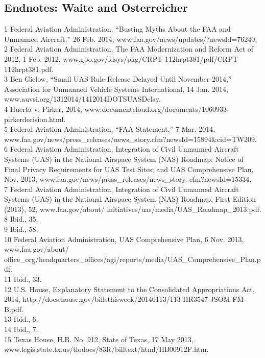 \begin{itemize}
\begin{itemized}
\begin{itemize}
\section{Endnotes: Waite and Osterreicher}
1 Federal Aviation Administration, ``Busting Myths About the FAA and Unmanned Aircraft,'' 26 Feb.
2014, www.faa.gov/news/updates/?newsId=76240.\\
2 Federal Aviation Administration, The FAA Modernization and Reform Act of 2012, 1 Feb. 2012,
www.gpo.gov/fdsys/pkg/CRPT-112hrpt381/pdf/CRPT-112hrpt381.pdf.\\
3 Ben Gielow, ``Small UAS Rule Release Delayed Until November 2014,'' Association for Unmanned
Vehicle Systems International, 14 Jan. 2014, www.auvsi.org/1312014/1412014DOTSUASDelay.\\
4 Huerta v. Pirker, 2014, www.documentcloud.org/documents/1060933-pirkerdecision.html.\\
5 Federal Aviation Administration, ``FAA Statement,'' 7 Mar. 2014, www.faa.gov/news/press_releases/news_story.cfm?newsId=15894&cid=TW209.\\
6 Federal Aviation Administration, Integration of Civil Unmanned Aircraft Systems (UAS) in the
National Airspace System (NAS) Roadmap; Notice of Final Privacy Requirements for UAS Test
Sites; and UAS Comprehensive Plan, Nov. 2013, www.faa.gov/news/press_releases/news_story.
cfm?newsId=15334.\\
7 Federal Aviation Administration, Integration of Civil Unmanned Aircraft Systems (UAS) in
the National Airspace System (NAS) Roadmap, First Edition (2013), 52, www.faa.gov/about/
initiatives/uas/media/UAS_Roadmap_2013.pdf.\\
8 Ibid., 35.\\
9 Ibid., 58.\\
10 Federal Aviation Administration, UAS Comprehensive Plan, 6 Nov. 2013, www.faa.gov/about/
office_org/headquarters_offices/agi/reports/media/UAS_Comprehensive_Plan.pdf.\\
11 Ibid., 33.\\
12 U.S. House, Explanatory Statement to the Consolidated Appropriations Act, 2014,
http://docs.house.gov/billsthisweek/20140113/113-HR3547-JSOM-FM-B.pdf.\\
13 Ibid., 6.\\
14 Ibid., 7.\\
15 Texas House, H.B. No. 912, State of Texas, 17 May 2013,
www.legis.state.tx.us/tlodocs/83R/billtext/html/HB00912F.htm.\\

\end{itemize}
\end{itemized}
\end{itemize}
